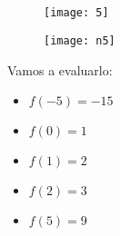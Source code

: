 \documentclass[journal,onecolumn,10pt,fleqn]{IEEEtran}%
\theoremstyle{break}                                            %
\begin{document}
  \clearpage
\section{}
  \begin{figure}[ht]
    \texttt{[image: 5]}
  \end{figure}

  \begin{figure}[ht]
    \texttt{[image: n5]}
  \end{figure}

  Vamos a evaluarlo:
  \begin{itemize}
    \item $f(-5) = -15$
    \item $f(0) = 1$
    \item $f(1) = 2$
    \item $f(2) = 3$
    \item $f(5) = 9$
  \end{itemize}
\end{document}
